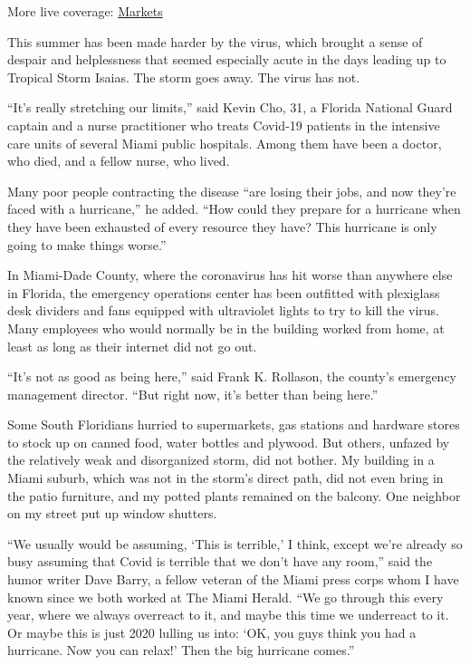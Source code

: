 More live coverage:
\href{https://www.nytimes3xbfgragh.onion/live/2020/07/31/business/stock-market-today-coronavirus?action=click\&pgtype=Article\&state=default\&region=MAIN_CONTENT_1\&context=storylines_live_updates}{Markets}

This summer has been made harder by the virus, which brought a sense of
despair and helplessness that seemed especially acute in the days
leading up to Tropical Storm Isaias. The storm goes away. The virus has
not.

``It's really stretching our limits,'' said Kevin Cho, 31, a Florida
National Guard captain and a nurse practitioner who treats Covid-19
patients in the intensive care units of several Miami public hospitals.
Among them have been a doctor, who died, and a fellow nurse, who lived.

Many poor people contracting the disease ``are losing their jobs, and
now they're faced with a hurricane,'' he added. ``How could they prepare
for a hurricane when they have been exhausted of every resource they
have? This hurricane is only going to make things worse.''

In Miami-Dade County, where the coronavirus has hit worse than anywhere
else in Florida, the emergency operations center has been outfitted with
plexiglass desk dividers and fans equipped with ultraviolet lights to
try to kill the virus. Many employees who would normally be in the
building worked from home, at least as long as their internet did not go
out.

``It's not as good as being here,'' said Frank K. Rollason, the county's
emergency management director. ``But right now, it's better than being
here.''

Some South Floridians hurried to supermarkets, gas stations and hardware
stores to stock up on canned food, water bottles and plywood. But
others, unfazed by the relatively weak and disorganized storm, did not
bother. My building in a Miami suburb, which was not in the storm's
direct path, did not even bring in the patio furniture, and my potted
plants remained on the balcony. One neighbor on my street put up window
shutters.

``We usually would be assuming, `This is terrible,' I think, except
we're already so busy assuming that Covid is terrible that we don't have
any room,'' said the humor writer Dave Barry, a fellow veteran of the
Miami press corps whom I have known since we both worked at The Miami
Herald. ``We go through this every year, where we always overreact to
it, and maybe this time we underreact to it. Or maybe this is just 2020
lulling us into: `OK, you guys think you had a hurricane. Now you can
relax!' Then the big hurricane comes.''

